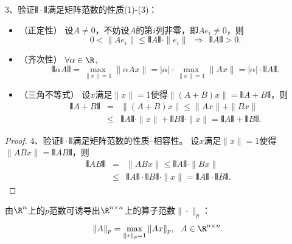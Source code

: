 \begin{frame}\ft{\subsecname}

\begin{zhengming}
3、验证$\VERT \cdot\VERT $满足矩阵范数的性质(1)-(3)：\pause
\begin{itemize}
\item（正定性） 设$A\ne 0$，不妨设$A$的第$i$列非零，即$Ae_i\ne 0$，则
$$ 0 < \|A e_i\| \le \VERT A\VERT  \cdot \|e_i\|   
~~\Longrightarrow~~ 
\VERT  A \VERT  > 0. 
$$
\item\pause（齐次性）  $\forall \alpha \in \R$,
\[
\VERT \alpha A\VERT  = \max_{\|x\|=1} \| \alpha A x\| = |\alpha| \cdot \max_{\|x\|=1} \|Ax\| = |\alpha| \cdot \VERT A\VERT.
\]  
\item\pause（三角不等式） 设$x$满足$\|x\|=1$使得$\|(A+B)x\|=\VERT A+B\VERT $，则
$$
\begin{array}{rcl}
\VERT A+B\VERT  &=& \|(A+B)x\| \le \|Ax\| + \|Bx\| \\
&\le& \VERT A\VERT \cdot\|x\| + \VERT B\VERT \cdot\|x\| = \VERT A\VERT  + \VERT B\VERT .            
\end{array}
$$
\end{itemize}
\end{zhengming}

\end{frame}


\begin{frame}\ft{\subsecname}

\begin{proof}
4、验证$\VERT \cdot\VERT $满足矩阵范数的性质--相容性。
  设$x$满足$\|x\|=1$使得$\|ABx\|=\VERT AB\VERT $，则
$$
\begin{array}{rcl}
\VERT AB\VERT  &=& \|ABx\| \le \VERT A\VERT  \cdot \|Bx\| \\[0.2cm]
&\le& \VERT A\VERT \cdot \VERT B\VERT \cdot\|x\| = \VERT A\VERT  \cdot \VERT B\VERT .            
\end{array}
$$
\end{proof}

\end{frame}


\begin{frame}\ft{\subsecname}

由$\R^n$上的$p$范数可诱导出$\R^{n\times n}$上的算子范数$\|\cdot\|_p$：
$$
\|A\|_p = \max_{\|x\|_p=1}\|Ax\|_p, ~~ A \in \R^{n\times n}.
$$

\end{frame}


